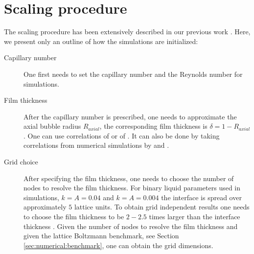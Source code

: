 \documentclass[preprint,12pt]{elsarticle}
\begin{document}
\section{Scaling procedure}
\label{append:scaling}
The scaling procedure has been extensively  described in our previous work \cite{kuzmin-binary2d}.
Here, we present
only an outline of how the simulations are initialized:
\begin{description}
 \item[Capillary number] One first needs to set the capillary number and the Reynolds number for
simulations. 
 \item[Film thickness] After the capillary number is prescribed, one needs to approximate the axial
bubble radius $R_{axial}$, the corresponding film thickness is $\delta=1-R_{axial}$. One can use
correlations of \citet{shikazono-square} or of \citet{kreutzer-taylor}. It can also be done by
taking correlations from numerical simulations by
\citet{heil-bretherton} and \citet{giavedoni-numerical}.  
\item[Grid choice] After specifying the film thickness, one needs to choose the
number of nodes to resolve the film thickness. For binary liquid parameters used in simulations,
$k=A=0.04$ and $k=A=0.004$ the
interface is spread over approximately $5$ lattice units. To obtain grid independent results one
needs to choose the
film thickness to be $2-2.5$ times larger than the interface thickness \cite{kuzmin-binary2d}.
Given the number of nodes to resolve the film thickness and given the lattice Boltzmann
benchmark, see Section \ref{sec:numerical:benchmark}, one can obtain the grid dimensions.


\end{description}
\end{document}
